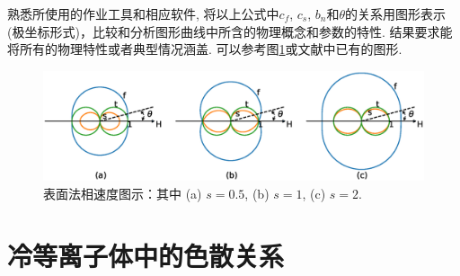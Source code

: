 \documentclass{article}
\begin{document}
	熟悉所使用的作业工具和相应软件, 将以上公式中$c_f$, $c_s$,
	$b_n$和$\theta$的关系用图形表示(极坐标形式)，比较和分析图形曲线中所含的物理概念和参数的特性.
	结果要求能将所有的物理特性或者典型情况涵盖. 可以参考图\ref{Friedrich}或文献\citet{Jeffrey1964}中已有的图形.
	\begin{figure}[htb]
		\centering
		\includegraphics[width=\textwidth]{figure1.eps}
		\caption{表面法相速度图示：其中 (a) $s = 0.5$, (b) $s=1$, (c) $s=2$.}\label{Friedrich}
	\end{figure}
	
	\section{冷等离子体中的色散关系}
	
\end{document}
